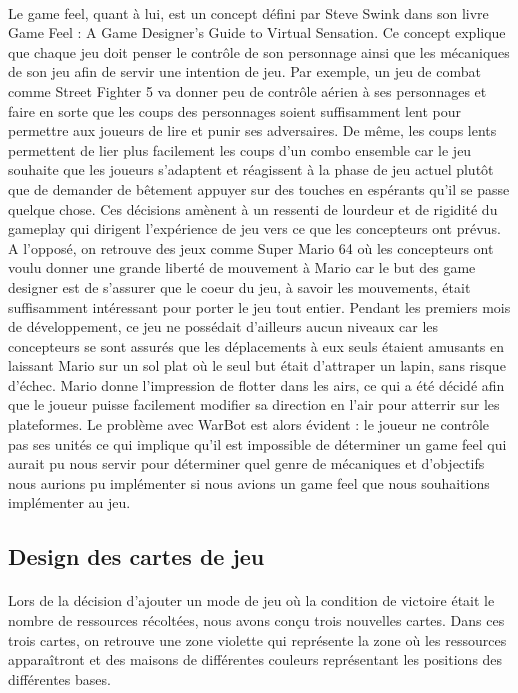 \documentclass{report}
\begin{document}
\paragraph{}


  Le game feel, quant à lui, est un concept défini par Steve Swink dans son livre Game Feel : A Game Designer’s Guide to Virtual Sensation. Ce concept explique que chaque jeu doit penser le contrôle de son personnage ainsi que les mécaniques de son jeu afin de servir une intention de jeu. Par exemple, un jeu de combat comme Street Fighter 5 va donner peu de contrôle aérien à ses personnages et faire en sorte que les coups des personnages soient suffisamment lent pour permettre aux joueurs de lire et punir ses adversaires. De même, les coups lents permettent de lier plus facilement les coups d’un combo ensemble car le jeu souhaite que les joueurs s’adaptent et réagissent à la phase de jeu actuel plutôt que de demander de bêtement appuyer sur des touches en espérants qu’il se passe quelque chose. Ces décisions amènent à un ressenti de lourdeur et de rigidité du gameplay qui dirigent l’expérience de jeu vers ce que les concepteurs ont prévus. \newline
A l’opposé, on retrouve des jeux comme Super Mario 64 où les concepteurs ont voulu donner une grande liberté de mouvement à Mario car le but des game designer est de s’assurer que le coeur du jeu, à savoir les mouvements, était suffisamment intéressant pour porter le jeu tout entier. Pendant les premiers mois de développement, ce jeu ne possédait d’ailleurs aucun niveaux car les concepteurs se sont assurés que les déplacements à eux seuls étaient amusants en laissant Mario sur un sol plat où le seul but était d’attraper un lapin, sans risque d’échec. Mario donne l’impression de flotter dans les airs, ce qui a été décidé afin que le joueur puisse facilement modifier sa direction en l’air pour atterrir sur les plateformes. \newline
Le problème avec WarBot est alors évident : le joueur ne contrôle pas ses unités ce qui implique qu’il est impossible de déterminer un game feel qui aurait pu nous servir pour déterminer quel genre de mécaniques et d’objectifs nous aurions pu implémenter si nous avions un game feel que nous souhaitions implémenter au jeu.
\newpage
\subsection{Design des cartes de jeu}
\paragraph{}
  Lors de la décision d’ajouter un mode de jeu où la condition de victoire était le nombre de ressources récoltées, nous avons conçu trois nouvelles cartes. Dans ces trois cartes, on retrouve une zone violette qui représente la zone où les ressources apparaîtront et des maisons de différentes couleurs représentant les positions des différentes bases.
\end{document}
